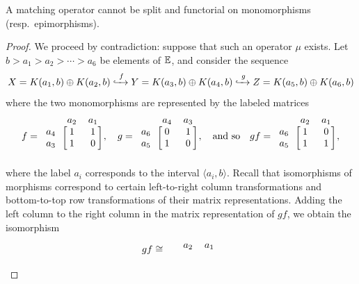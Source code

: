 \begin{proposition}
\label{C!P:split-nand-functorial}
  A matching operator cannot be split and functorial on monomorphisms (resp.\ epimorphisms).
\end{proposition}

\begin{proof}
  We proceed by contradiction: suppose that such an operator $\mu$ exists. Let $b > a_1 > a_2 > \cdots > a_6$ be elements of $\mathbb{E}$, and consider the sequence
  \[
  X = K(a_1, b) \oplus K(a_2, b) \xhookrightarrow{\; f \;} Y = K(a_3, b) \oplus K(a_4, b) \xhookrightarrow{\; g \;} Z = K(a_5,b) \oplus K(a_6, b) 
  \]
  where the two monomorphisms are represented by the labeled matrices
  \[
  f = \begin{blockarray}{c cc}
  & a_2 & a_1 \\
  \begin{block}{c [cc]}
  a_4 & 1 & 1 \\
  a_3 & 1 & 0 \\
  \end{block}
  \end{blockarray},
  \quad
  g = \begin{blockarray}{c cc}
  & a_4 & a_3 \\
  \begin{block}{c [cc]}
  a_6 & 0 & 1 \\
  a_5 & 1 & 0 \\
  \end{block}
  \end{blockarray},
  \quad \text{and so} \quad
  gf = \begin{blockarray}{c cc}
  & a_2 & a_1 \\
  \begin{block}{c [cc]}
  a_6 & 1 & 0 \\
  a_5 & 1 & 1 \\
  \end{block}
  \end{blockarray},
  \]
  where the label $a_i$ corresponds to the interval $\langle a_i, b\rangle$.
  Recall that isomorphisms of morphisms correspond to certain left-to-right column transformations and bottom-to-top row transformations of their matrix representations. Adding the left column to the right column in the matrix representation of $gf$, we obtain the isomorphism
  \begin{equation}
  \label{C!E:counterex-in-proof}
    gf
    \cong
    \begin{blockarray}{c cc}
      & a_2 & a_1 \\

\end{blockarray}
\end{equation}
\end{proof}
